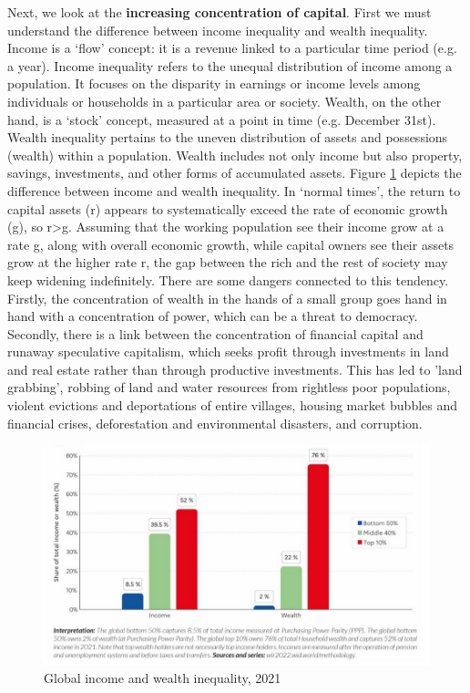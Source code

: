 \documentclass[../summary.tex]{subfiles}
\begin{document}
	 Next, we look at the \textbf{increasing concentration of capital}. First we must understand the difference between income inequality and wealth inequality. Income is a ‘flow’ concept: it is a revenue linked to a particular time period (e.g. a year). Income inequality refers to the unequal distribution of income among a population. It focuses on the disparity in earnings or income levels among individuals or households in a particular area or society. Wealth, on the other hand, is a ‘stock’ concept, measured at a point in time (e.g. December 31st). Wealth inequality pertains to the uneven distribution of assets and possessions (wealth) within a population. Wealth includes not only income but also property, savings, investments, and other forms of accumulated assets. Figure \ref{fig:income-versus-wealth} depicts the difference between income and wealth inequality. In ‘normal times’, the return to capital assets (r) appears to systematically exceed the rate of economic growth (g), so r>g. Assuming that the working population see their income grow at a rate g, along with overall economic growth, while capital owners see their assets grow at the higher rate r, the gap between the rich and the rest of society may keep widening indefinitely. There are some dangers connected to this tendency. Firstly, the concentration of wealth in the hands of a small group goes hand in hand with a concentration of power, which can be a threat to democracy. Secondly, there is a link between the concentration of financial capital and runaway speculative capitalism, which seeks profit through investments in land and real estate rather than through productive investments. This has led to 'land grabbing', robbing of land and water resources from rightless poor populations, violent evictions and deportations of entire villages, housing market bubbles and financial crises, deforestation and environmental disasters, and corruption.
	 \\
	 \begin{figure}[htbp]
	 	\centering
	 	\includegraphics[width=1\linewidth]{images/11-income-versus-wealth.png}
	 	\caption{Global income and wealth inequality, 2021}
	 	\label{fig:income-versus-wealth}
	 \end{figure}
	
\end{document}
